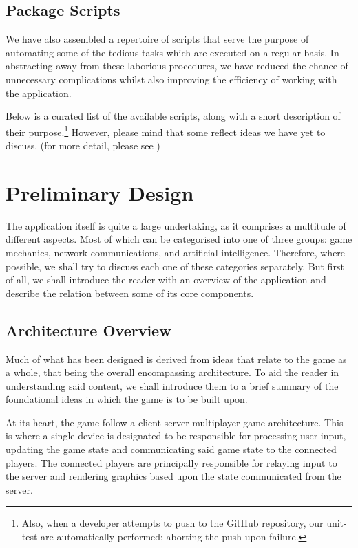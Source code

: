\documentclass{standalone}
\begin{document}
		\subsection{Package Scripts}
			We have also assembled a repertoire of scripts that serve the purpose of automating some of the tedious tasks which are executed on a regular basis. In abstracting away from these laborious procedures, we have reduced the chance of unnecessary complications whilst also improving the efficiency of working with the application.

			Below is a curated list of the available scripts, along with a short description of their purpose.\footnote{Also, when a developer attempts to push to the GitHub repository, our unit-test are automatically performed; aborting the push upon failure.} However, please mind that some reflect ideas we have yet to discuss. (for more detail, please see )
			\begin{formal}
				
			\end{formal}

	\section{Preliminary Design}
		The application itself is quite a large undertaking, as it comprises a multitude of different aspects. Most of which can be categorised into one of three groups: game mechanics, network communications, and artificial intelligence. Therefore, where possible, we shall try to discuss each one of these categories separately. But first of all, we shall introduce the reader with an overview of the application and describe the relation between some of its core components.

		\subsection{Architecture Overview} \label{sec:architectureOverview}
			Much of what has been designed is derived from ideas that relate to the game as a whole, that being the overall encompassing architecture. To aid the reader in understanding said content, we shall introduce them to a brief summary of the foundational ideas in which the game is to be built upon.

			At its heart, the game follow a client-server multiplayer game architecture. This is where a single device is designated to be responsible for processing user-input, updating the game state and communicating said game state to the connected players. The connected players are principally responsible for relaying input to the server and rendering graphics based upon the state communicated from the server.
\end{document}
